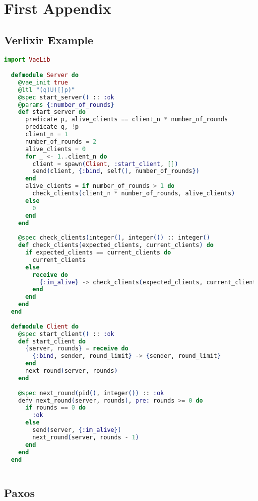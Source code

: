 \appendix
\chapter{First Appendix}
\section{Verlixir Example}

\begin{lstlisting}[language=Elixir, xleftmargin=.1\linewidth]
  import VaeLib

  defmodule Server do
    @vae_init true
    @ltl "(q)U([]p)"
    @spec start_server() :: :ok
    @params {:number_of_rounds}
    def start_server do
      predicate p, alive_clients == client_n * number_of_rounds
      predicate q, !p
      client_n = 1
      number_of_rounds = 2
      alive_clients = 0
      for _ <- 1..client_n do
        client = spawn(Client, :start_client, [])
        send(client, {:bind, self(), number_of_rounds})
      end
      alive_clients = if number_of_rounds > 1 do
        check_clients(client_n * number_of_rounds, alive_clients)
      else
        0
      end
    end
  
    @spec check_clients(integer(), integer()) :: integer()
    def check_clients(expected_clients, current_clients) do
      if expected_clients == current_clients do
        current_clients
      else
        receive do
          {:im_alive} -> check_clients(expected_clients, current_clients + 1)
        end
      end
    end
  end
  
  defmodule Client do
    @spec start_client() :: :ok
    def start_client do
      {server, rounds} = receive do
        {:bind, sender, round_limit} -> {sender, round_limit}
      end
      next_round(server, rounds)
    end
  
    @spec next_round(pid(), integer()) :: :ok
    defv next_round(server, rounds), pre: rounds >= 0 do
      if rounds == 0 do
        :ok
      else
        send(server, {:im_alive})
        next_round(server, rounds - 1)
      end
    end
  end
  
\end{lstlisting}

\section{Paxos}
